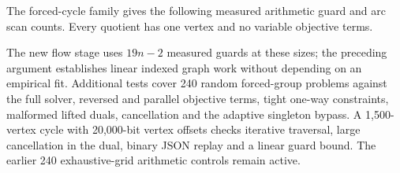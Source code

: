 The forced-cycle family gives the following measured arithmetic guard and arc
scan counts. Every quotient has one vertex and no variable objective terms.
\begin{center}
\small

\end{center}
The new flow stage uses $19n-2$ measured guards at these sizes; the preceding argument
establishes linear indexed graph work without depending on an empirical fit.
Additional tests cover 240 random forced-group problems against the full
solver, reversed and parallel objective terms, tight one-way constraints,
malformed lifted duals, cancellation and the adaptive singleton bypass. A
1,500-vertex cycle with 20,000-bit vertex offsets checks iterative traversal,
large cancellation in the dual, binary JSON replay and a linear guard bound.
The earlier 240 exhaustive-grid arithmetic controls remain active.


